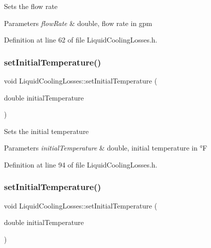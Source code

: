 Sets the flow rate 
\begin{DoxyParams}{Parameters}
{\em flow\+Rate} & double, flow rate in gpm \\
\hline
\end{DoxyParams}


Definition at line 62 of file Liquid\+Cooling\+Losses.\+h.

\mbox{\label{class_liquid_cooling_losses_aa7f7718de77a96b8e269a06a24d297d8}} 
\subsubsection{\texorpdfstring{set\+Initial\+Temperature()}{setInitialTemperature()}\hspace{0.1cm}{\footnotesize\ttfamily [1/3]}}
{\footnotesize\ttfamily void Liquid\+Cooling\+Losses\+::set\+Initial\+Temperature (\begin{DoxyParamCaption}\item[{double}]{initial\+Temperature }\end{DoxyParamCaption})\hspace{0.3cm}{\ttfamily [inline]}}

Sets the initial temperature 
\begin{DoxyParams}{Parameters}
{\em initial\+Temperature} & double, initial temperature in °F \\
\hline
\end{DoxyParams}


Definition at line 94 of file Liquid\+Cooling\+Losses.\+h.

\mbox{\label{class_liquid_cooling_losses_aa7f7718de77a96b8e269a06a24d297d8}} 
\subsubsection{\texorpdfstring{set\+Initial\+Temperature()}{setInitialTemperature()}\hspace{0.1cm}{\footnotesize\ttfamily [2/3]}}
{\footnotesize\ttfamily void Liquid\+Cooling\+Losses\+::set\+Initial\+Temperature (\begin{DoxyParamCaption}\item[{double}]{initial\+Temperature }\end{DoxyParamCaption})\hspace{0.3cm}{\ttfamily [inline]}}

